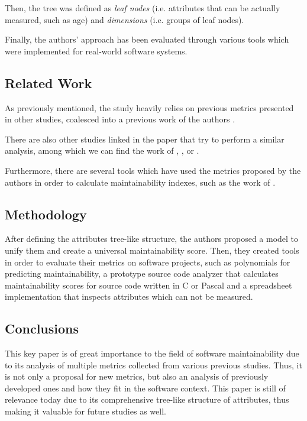 \documentclass[a4paper,12pt]{article}
\begin{document}
Then, the tree was defined as \emph{leaf nodes} (i.e. attributes that can be 
actually measured, such as age) and \emph{dimensions} (i.e. groups of leaf nodes).

Finally, the authors' approach has been evaluated through various tools which were
implemented for real-world software systems.

\subsection{Related Work}

As previously mentioned, the study heavily relies on previous metrics presented 
in other studies, coalesced into a previous work of the authors 
\citep{oman1992definition}. 

There are also other studies linked in the paper that try to perform a similar analysis,
among which we can find the work of \citet{basili1983empirical}, 
\citet{peercy1981software}, \citet{selby1989software} or \citet{kafura1987use}.

Furthermore, there are several tools which have used the metrics proposed by the
authors in order to calculate maintainability indexes, such as the work of
\citet{omen1992construction}.

\subsection{Methodology}

After defining the attributes tree-like structure, the authors proposed
a model to unify them and create a universal maintainability score. Then,
they created tools in order to evaluate their metrics on software projects,
such as polynomials for predicting maintainability, a prototype source code
analyzer that calculates maintainability scores for source code written in
C or Pascal and a spreadsheet implementation that inspects attributes which
can not be measured.

\subsection{Conclusions}

This key paper is of great importance to the field of software maintainability
due to its analysis of multiple metrics collected from various previous studies.
Thus, it is not only a proposal for new metrics, but also an analysis of 
previously developed ones and how they fit in the software context. This paper
is still of relevance today due to its comprehensive tree-like structure of 
attributes, thus making it valuable for future studies as well.
\end{document}
